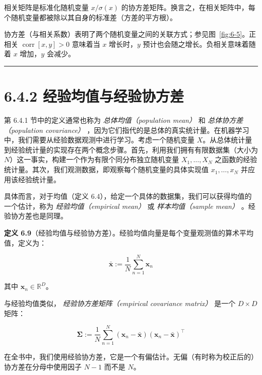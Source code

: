 相关矩阵是标准化随机变量 $ x / \sigma(x) $ 的协方差矩阵。换言之，在相关矩阵中，每个随机变量都被除以其自身的标准差（方差的平方根）。

协方差（与相关系数）表明了两个随机变量之间的关联方式；参见图~\ref{fig:6-5}。正相关 $ \operatorname{corr}[x, y] > 0 $ 意味着当 $ x $ 增长时，$ y $ 预计也会随之增长。负相关意味着随着 $ x $ 增加，$ y $ 会减少。

\medskip\hrule\medskip

\section*{6.4.2 经验均值与经验协方差}

第 6.4.1 节中的定义通常也称为 \emph{总体均值（population mean）} 和 \emph{总体协方差（population covariance）} ，因为它们指代的是总体的真实统计量。在机器学习中，我们需要从经验数据观测中进行学习。考虑一个随机变量 $ X $。从总体统计量到经验统计量的实现存在两个概念步骤。首先，利用我们拥有有限数据集（大小为 $ N $）这一事实，构建一个作为有限个同分布独立随机变量 $ X_1, \ldots, X_N $ 之函数的经验统计量。其次，我们观测数据，即观察每个随机变量的具体实现值 $ x_1, \ldots, x_N $ 并应用该经验统计量。

具体而言，对于均值（定义 6.4），给定一个具体的数据集，我们可以获得均值的一个估计，称为 \emph{经验均值（empirical mean）} 或 \emph{样本均值（sample mean）} 。经验协方差也是同理。

\textbf{定义 6.9}（经验均值与经验协方差）。经验均值向量是每个变量观测值的算术平均值，定义为：

\begin{equation}
\bar{\boldsymbol{x}} := \frac{1}{N} \sum_{n=1}^N \boldsymbol{x}_n
\tag{6.41}\label{eq:6-41}
\end{equation}

其中 $ \boldsymbol{x}_n \in \mathbb{R}^D $。

与经验均值类似， \emph{经验协方差矩阵（empirical covariance matrix）} 是一个 $ D \times D $ 矩阵：

\begin{equation}
\boldsymbol{\Sigma} := \frac{1}{N} \sum_{n=1}^N (\boldsymbol{x}_n - \bar{\boldsymbol{x}})(\boldsymbol{x}_n - \bar{\boldsymbol{x}})^\top
\tag{6.42}\label{eq:6-42}
\end{equation}

在全书中，我们使用经验协方差，它是一个有偏估计。无偏（有时称为校正后的）协方差在分母中使用因子 $ N - 1 $ 而不是 $ N $。

